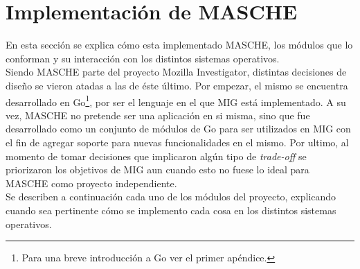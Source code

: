 \section{Implementación de MASCHE}

En esta sección se explica cómo esta implementado MASCHE, los módulos que lo
conforman y su interacción con los distintos sistemas operativos.\\

Siendo MASCHE parte del proyecto Mozilla Investigator, distintas decisiones de
diseño se vieron atadas a las de éste último. Por empezar, el mismo se
encuentra desarrollado en Go\footnote{Para una breve introducción a Go ver el
primer apéndice.}, por ser el lenguaje en el que MIG está implementado. A su
vez, MASCHE no pretende ser una aplicación en si misma, sino que fue
desarrollado como un conjunto de módulos de Go para ser utilizados en MIG con
el fin de agregar soporte para nuevas funcionalidades en el mismo. Por ultimo,
al momento de tomar decisiones que implicaron algún tipo de \textit{trade-off}
se priorizaron los objetivos de MIG aun cuando esto no fuese lo ideal para
MASCHE como proyecto independiente.\\

Se describen a continuación cada uno de los módulos del proyecto, explicando
cuando sea pertinente cómo se implemento cada cosa en los distintos sistemas
operativos.\\
